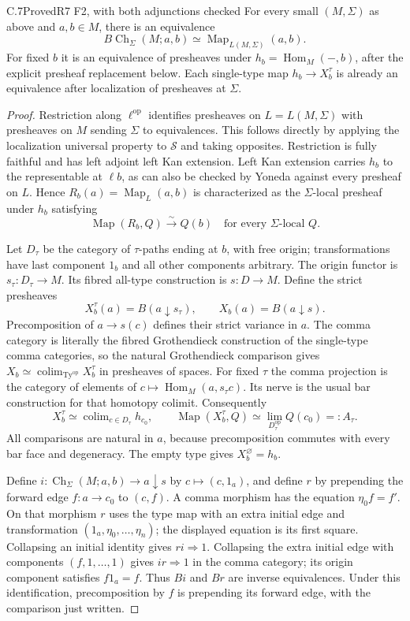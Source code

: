 \begin{claim}{C.7}{Proved}{R7 F2, with both adjunctions checked}
For every small $(M,\Sigma)$ as above and $a,b\in M$, there is an
equivalence
\[
 B\operatorname{Ch}_\Sigma(M;a,b)\simeq
 \operatorname{Map}_{L(M,\Sigma)}(a,b).
\]
For fixed $b$ it is an equivalence of presheaves under
$h_b=\operatorname{Hom}_M(-,b)$, after the explicit presheaf
replacement below. Each single-type map $h_b\to X_b^\tau$
is already an equivalence after localization of presheaves at
$\Sigma$.
\end{claim}
\begin{proof}
Restriction along $\ell^{\mathrm{op}}$ identifies presheaves on
$L=L(M,\Sigma)$ with presheaves on $M$ sending $\Sigma$ to
equivalences. This follows directly by applying the localization
universal property to $\mathcal S$ and taking opposites. Restriction
is fully faithful and has left adjoint left Kan extension. Left Kan
extension carries $h_b$ to the representable at $\ell b$, as can
also be checked by Yoneda against every presheaf on $L$. Hence
$R_b(a)=\operatorname{Map}_L(a,b)$ is characterized as the
$\Sigma$-local presheaf under $h_b$ satisfying
\[
 \operatorname{Map}(R_b,Q)\xrightarrow{\sim}Q(b)
 \quad\text{for every $\Sigma$-local $Q$.}
\]

Let $D_\tau$ be the category of $\tau$-paths ending at $b$, with
free origin; transformations have last component $1_b$ and all
other components arbitrary. The origin functor is
$s_\tau:D_\tau\to M$. Its fibred all-type construction is
$s:D\to M$. Define the strict presheaves
\[
 X_b^\tau(a)=B(a\downarrow s_\tau),\qquad
 X_b(a)=B(a\downarrow s).
\]
Precomposition of $a\to s(c)$ defines their strict variance in $a$.
The comma category is literally the fibred Grothendieck construction
of the single-type comma categories, so the natural Grothendieck
comparison gives
$X_b\simeq\operatorname{colim}_{\mathrm{Ty}^{\mathrm{op}}}
X_b^\tau$ in presheaves of spaces. For fixed $\tau$ the comma
projection is the category of elements of $c\mapsto
\operatorname{Hom}_M(a,s_\tau c)$. Its nerve is the usual bar
construction for that homotopy colimit. Consequently
\[
 X_b^\tau\simeq\operatorname{colim}_{c\in D_\tau}h_{c_0},
 \qquad
 \operatorname{Map}(X_b^\tau,Q)
 \simeq\lim_{D_\tau^{\mathrm{op}}}Q(c_0)=:A_\tau.
\]
All comparisons are natural in $a$, because precomposition commutes
with every bar face and degeneracy. The empty type gives $X_b^\varnothing=h_b$.

Define $i:\operatorname{Ch}_\Sigma(M;a,b)\to a\downarrow s$
by $c\mapsto(c,1_a)$, and define $r$ by prepending the forward
edge $f:a\to c_0$ to $(c,f)$. A comma morphism has the equation
$\eta_0 f=f'$. On that morphism $r$ uses the type map with an
extra initial edge and transformation $(1_a,\eta_0,\ldots,\eta_n)$;
the displayed equation is its first square. Collapsing an initial
identity gives $ri\Rightarrow1$. Collapsing the extra initial
edge with components $(f,1,\ldots,1)$ gives $ir\Rightarrow1$
in the comma category; its origin component satisfies
$f1_a=f$. Thus $Bi$ and $Br$ are inverse equivalences. Under this
identification, precomposition by $f$ is prepending its forward edge,
with the comparison just written.


\end{proof}
